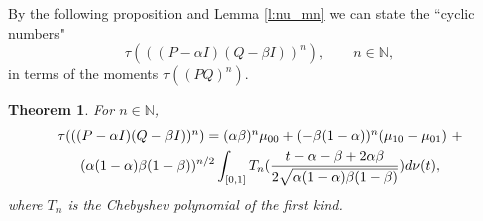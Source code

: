 \documentclass{amsart}
\newcommand{\N}{\mathbb N}
\newtheorem{thm}{Theorem}[section]
\theoremstyle{definition}
\begin{document}
By the following proposition and Lemma \ref{l:nu_mn} we can state the ``cyclic numbers"
$$\tau(((P-\alpha I)(Q-\beta I))^n),\qquad n\in\N,$$
in terms of the moments $\tau((PQ)^n)$.
\begin{thm}\label{t:mn_zn}
For $n\in\N$, 
\begin{multline*}
$$\tau(((P-\alpha I)(Q-\beta I))^n)=(\alpha \beta )^n\mu_{00}+(-\beta (1-\alpha ))^n(\mu_{10}-\mu_{01})\,\,+\\
(\alpha (1-\alpha )\beta (1-\beta ))^{n/2}\int_{[0,1]}T_n(\frac{t-\alpha -\beta +2\alpha \beta }{2\sqrt{\alpha (1-\alpha )\beta (1-\beta )}})d\nu(t),
\end{multline*}
where $T_n$ is the Chebyshev polynomial of the first kind.
\end{thm}
\end{document}
